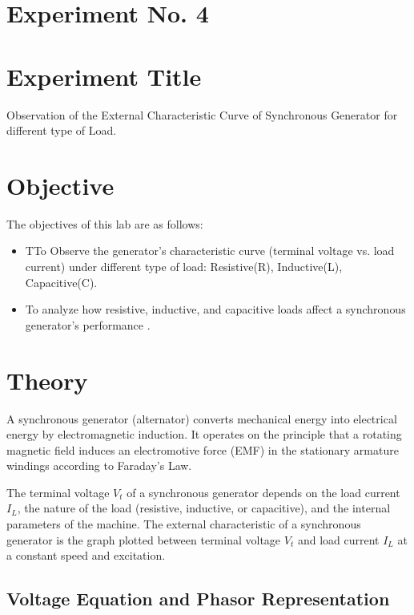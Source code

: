 \documentclass[a4paper,12pt]{article}
\begin{document}
	\section{Experiment No. 4}
	
	\section{Experiment Title }
	Observation of the External Characteristic Curve of Synchronous Generator for different type of
	Load.
	
	\section{Objective}
	
	The objectives of this lab are as follows:
	\begin{itemize}
		\item TTo Observe the generator’s characteristic curve (terminal voltage vs. load current) under
		different type of load: Resistive(R), Inductive(L), Capacitive(C).
		\item To analyze how resistive, inductive, and capacitive loads affect a synchronous generator’s
		performance .
		
		
	\end{itemize}
	
	\section{Theory}
	

A synchronous generator (alternator) converts mechanical energy into electrical energy by electromagnetic induction. It operates on the principle that a rotating magnetic field induces an electromotive force (EMF) in the stationary armature windings according to Faraday's Law.

The terminal voltage \( V_t \) of a synchronous generator depends on the load current \( I_L \), the nature of the load (resistive, inductive, or capacitive), and the internal parameters of the machine. The external characteristic of a synchronous generator is the graph plotted between terminal voltage \( V_t \) and load current \( I_L \) at a constant speed and excitation.

\subsection{Voltage Equation and Phasor Representation}
\end{document}
